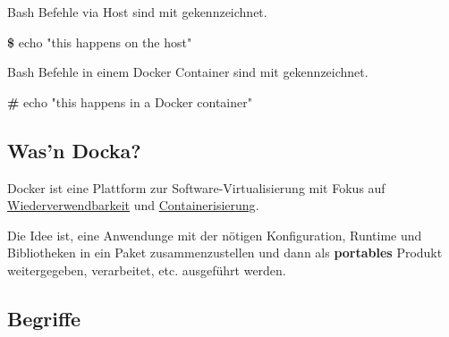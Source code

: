 \documentclass[
  10pt,
  a4paper,
  twocolumn]{article}
\newenvironment{Shaded}{}{}
\newcommand{\ExtensionTok}[1]{\textcolor[rgb]{0.84,0.23,0.29}{\textbf{#1}}}
\newcommand{\NormalTok}[1]{\textcolor[rgb]{0.14,0.16,0.18}{#1}}
\newcommand{\StringTok}[1]{\textcolor[rgb]{0.01,0.18,0.38}{#1}}
\begin{document}
\begin{tcolorbox}[enhanced jigsaw, colframe=quarto-callout-important-color-frame, bottomrule=.15mm, colback=white, left=2mm, toprule=.15mm, arc=.35mm, coltitle=black, opacityback=0, rightrule=.15mm, title=\textcolor{quarto-callout-important-color}{\faExclamation}\hspace{0.5em}{Wichtig}, colbacktitle=quarto-callout-important-color!10!white, opacitybacktitle=0.6, toptitle=1mm, bottomtitle=1mm, titlerule=0mm, leftrule=.75mm, breakable]

Bash Befehle via Host sind mit {\color{BrickRed}{\texttt{\textbf{\$}}}}
gekennzeichnet.

\begin{Shaded}
\begin{Highlighting}[]
\ExtensionTok{\$}\NormalTok{ echo }\StringTok{"this happens on the host"}
\end{Highlighting}
\end{Shaded}

Bash Befehle in einem Docker Container sind mit
{\color{BrickRed}{\texttt{\textbf{\#}}}} gekennzeichnet.

\begin{Shaded}
\begin{Highlighting}[]
\ExtensionTok{\#}\NormalTok{ echo }\StringTok{"this happens in a Docker container"}
\end{Highlighting}
\end{Shaded}

\end{tcolorbox}

\subsection{Was'n Docka?}\label{wasn-docka}

Docker ist eine Plattform zur Software-Virtualisierung mit Fokus auf
\ul{Wiederverwendbarkeit} und \ul{Containerisierung}.

Die Idee ist, eine Anwendunge mit der nötigen Konfiguration, Runtime und
Bibliotheken in ein Paket zusammenzustellen und dann als
\textbf{portables} Produkt weitergegeben, verarbeitet, etc. ausgeführt
werden.

\subsection{Begriffe}\label{begriffe}
\end{document}
